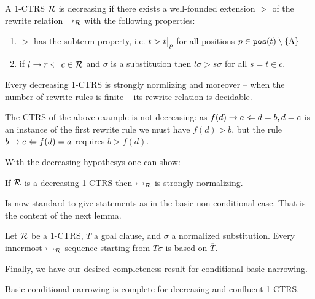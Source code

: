 \begin{definition}
    A 1-CTRS $\mathcal{R}$ is decreasing if there exists a well-founded extension $>$ of the rewrite relation $\rightarrow_{\mathcal{R}}$ with the following properties:
    \begin{enumerate}
        \item $>$ has the subterm property, i.e. $t > \restr{t}{p}$ for all positions $p \in \mathtt{pos}(t) \setminus \{\Lambda\}$
        \item if $l \rightarrow r \Leftarrow c \in \mathcal{R}$ and $\sigma$ is a substitution then $l\sigma > s \sigma$ for all $s = t \in c$.
    \end{enumerate}
\end{definition}

Every decreasing 1-CTRS is strongly normlizing and moreover -- when the number of rewrite rules is finite -- its rewrite relation is decidable.

\begin{example}
    The CTRS of the above example is not decreasing: as $f(d) \rightarrow a \Leftarrow d = b, d = c$ is an instance of the first rewrite rule we must have $f(d) > b$, but the rule $b \rightarrow c \Leftarrow f(d) = a$ requires $b > f(d)$.
\end{example}

With the decreasing hypothesys one can show:
\begin{lemma}
    If $\mathcal{R}$ is a decreasing 1-CTRS then $\rightarrowtail_{\mathcal{R}}$ is strongly normalizing.
\end{lemma}

Is now standard to give statements as in the basic non-conditional case. That is the content of the next lemma.
\begin{lemma}
    Let $\mathcal{R}$ be a 1-CTRS, $T$ a goal clause, and $\sigma$ a normalized substitution. Every innermost $\rightarrowtail_{\mathcal{R}}$-sequence starting from $T \sigma$ is based on $\overline{T}$.
\end{lemma}

Finally, we have our desired completeness result for conditional basic narrowing.
\begin{theorem}
    Basic conditional narrowing is complete for decreasing and confluent 1-CTRS.
\end{theorem}
